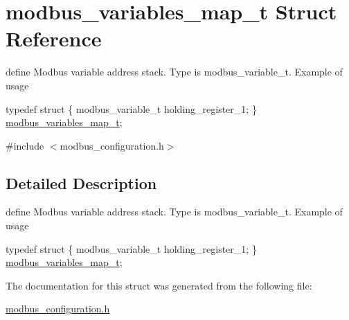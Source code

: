 \hypertarget{structmodbus__variables__map__t}{}\section{modbus\+\_\+variables\+\_\+map\+\_\+t Struct Reference}
\label{structmodbus__variables__map__t}


define Modbus variable address stack. Type is modbus\+\_\+variable\+\_\+t. Example of usage 
\begin{DoxyCode}
\textcolor{keyword}{typedef} \textcolor{keyword}{struct }\{
   modbus\_variable\_t holding\_register\_1;
\} \mbox{\hyperlink{structmodbus__variables__map__t}{modbus\_variables\_map\_t}};
\end{DoxyCode}
  




{\ttfamily \#include $<$modbus\+\_\+configuration.\+h$>$}



\subsection{Detailed Description}
define Modbus variable address stack. Type is modbus\+\_\+variable\+\_\+t. Example of usage 
\begin{DoxyCode}
\textcolor{keyword}{typedef} \textcolor{keyword}{struct }\{
   modbus\_variable\_t holding\_register\_1;
\} \mbox{\hyperlink{structmodbus__variables__map__t}{modbus\_variables\_map\_t}};
\end{DoxyCode}
 

The documentation for this struct was generated from the following file\+:\begin{DoxyCompactItemize}
\item 
\mbox{\hyperlink{modbus__configuration_8h}{modbus\+\_\+configuration.\+h}}\end{DoxyCompactItemize}
